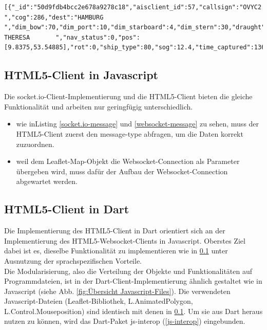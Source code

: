 \begin{lstlisting}[caption= vom socket.io-Server gesendete message, label=socket.io-message]
[{"_id":"50d9fdb4bcc2e678a9278c18","aisclient_id":57,"callsign":"OVYC2  ","cog":286,"dest":"HAMBURG             ","dim_bow":70,"dim_port":10,"dim_starboard":4,"dim_stern":30,"draught":54,"imo":"9363170","mmsi":220515000,"msgid":1,"name":"RIKKE THERESA       ","nav_status":0,"pos":[9.8375,53.54885],"rot":0,"ship_type":80,"sog":12.4,"time_captured":1366734056000,"time_received":1366734014715,"true_heading":288}]
\end{lstlisting}

\subsection{HTML5-Client in Javascript}\label{HTML5-Client in Javascript}
Die socket.io-Client-Implementierung und die HTML5-Client bieten die gleiche Funktionalität und arbeiten nur geringfügig unterschiedlich.
 \begin{itemize}
 \item wie inListing \ref{socket.io-message} und \ref{websocket-message} zu sehen, muss der HTML5-Client zuerst den message-type abfragen, um die Daten korrekt zuzuordnen.
 \item weil dem Leaflet-Map-Objekt die Websocket-Connection als Parameter übergeben wird, muss dafür der Aufbau der Websocket-Connection abgewartet werden. 
\end{itemize}

\subsection{HTML5-Client in Dart}\label{HTML5-Client in Dart}
Die Implementierung des HTML5-Client in Dart orientiert sich an der Implementierung des HTML5-Websocket-Clients in Javascript. Oberstes Ziel dabei ist es, dieselbe Funktionalität zu implementieren wie in \ref{HTML5-Client in Javascript} unter Ausnutzung der sprachspezifischen Vorteile. \\

Die Modularisierung, also die Verteilung der Objekte und Funktionalitäten auf Programmdateien, ist in der Dart-Client-Implementierung ähnlich gestaltet wie in Javascript (siehe Abb. \ref{fig:Übersicht Javascript-Files}). Die verwendeten Javascript-Dateien (Leaflet-Bibliothek, L.AnimatedPolygon, L.Control.Mouseposition) sind identisch mit denen in \ref{HTML5-Client in Javascript}. Um sie aus Dart heraus nutzen zu können, wird das Dart-Paket js-interop (\ref{js-interop}) eingebunden.

